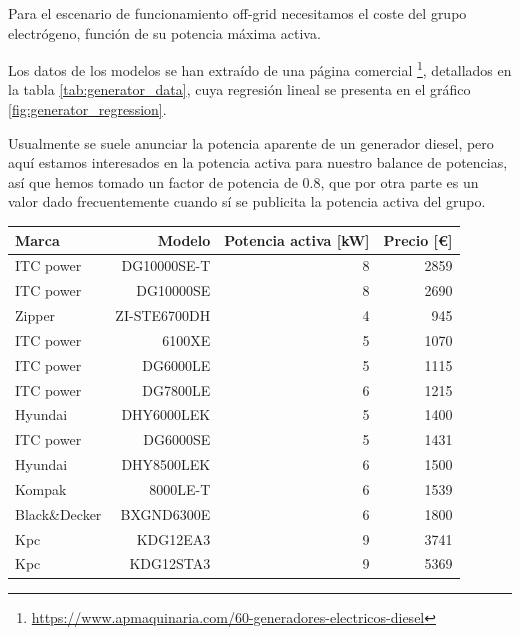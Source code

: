 Para el escenario de funcionamiento off-grid necesitamos el coste del grupo
electrógeno, función de su potencia máxima activa.

Los datos de los modelos se han extraído de una página comercial
\footnote{\url{https://www.apmaquinaria.com/60-generadores-electricos-diesel}},
detallados en la tabla \ref{tab:generator_data}, cuya regresión lineal se
presenta en el gráfico \ref{fig:generator_regression}.

Usualmente se suele anunciar la potencia aparente de un generador diesel, pero
aquí estamos interesados en la potencia activa para nuestro balance de
potencias, así que hemos tomado un factor de potencia de 0.8, que por otra
parte es un valor dado frecuentemente cuando sí se publicita la potencia activa
del grupo.

\begin{table}[htbp]
	\centering
	\begin{tabular}{lrrr}
		\toprule
		Marca         & Modelo         & Potencia activa [kW] & Precio [\euro] \\
		\midrule
		ITC power     & DG10000SE-T    & 8                    & 2859           \\
		ITC power     & DG10000SE      & 8                    & 2690           \\
		Zipper        & ZI-STE6700DH   & 4                    & 945            \\
		ITC power     & 6100XE         & 5                    & 1070           \\
		ITC power     & DG6000LE       & 5                    & 1115           \\
		ITC power     & DG7800LE       & 6                    & 1215           \\
		Hyundai       & DHY6000LEK     & 5                    & 1400           \\
		ITC power     & DG6000SE       & 5                    & 1431           \\
		Hyundai       & DHY8500LEK     & 6                    & 1500           \\
		Kompak        & 8000LE-T       & 6                    & 1539           \\
		Black\&Decker & BXGND6300E     & 6                    & 1800           \\
		Kpc           & KDG12EA3       & 9                    & 3741           \\
		Kpc           & KDG12STA3      & 9                    & 5369           \\

\end{tabular}
\end{table}
